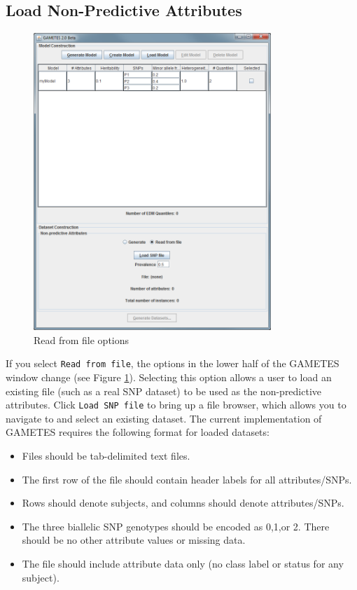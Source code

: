 \documentclass{report}
\begin{document}
\subsection{Load Non-Predictive Attributes}\label{loaddata}
\begin{figure}[t]
\centering
\includegraphics[width=0.8\textwidth]{Figure6_UG.png}%
\caption{Read from file options}
\label{readfile}
\end{figure}
If you select \texttt{Read from file}, the options in the lower half of the GAMETES window change (see Figure \ref{readfile}).  Selecting this option allows a user to load an existing file (such as a real SNP dataset) to be used as the non-predictive attributes.  Click \texttt{Load SNP file} to bring up a file browser, which allows you to navigate to and select an existing dataset. The current implementation of GAMETES requires the following format for loaded datasets:
\begin{itemize}
\item  Files should be tab-delimited text files.
\item  The first row of the file should contain header labels for all attributes/SNPs.
\item  Rows should denote subjects, and columns should denote attributes/SNPs.
\item  The three biallelic SNP genotypes should be encoded as 0,1,or 2.  There should be no other attribute values or missing data.
\item  The file should include attribute data only (no class label or status for any subject).
\end{itemize}
\end{document}
